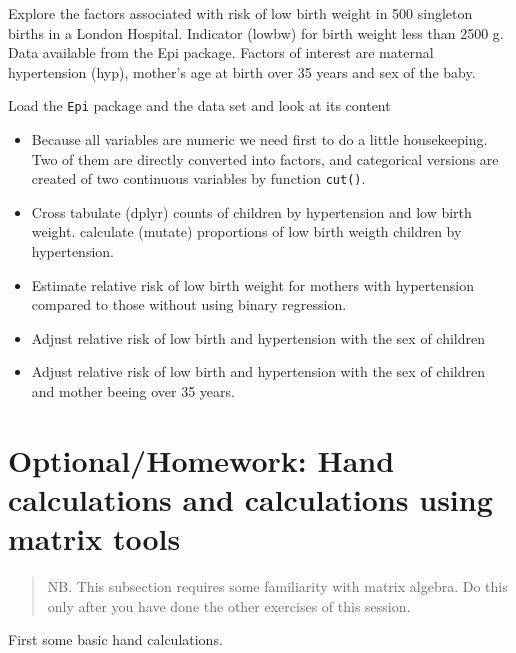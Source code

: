\documentclass[
]{book}
\begin{document}
Explore the factors associated with risk of low birth weight
in 500 singleton births in a London Hospital. Indicator (lowbw) for birth weight less than 2500 g. Data available from the Epi package. Factors of interest are
maternal hypertension (hyp), mother's age at birth over 35 years and sex of the baby.

Load the \texttt{Epi} package and the data set and look at its content

\begin{itemize}
\item
  Because all variables are numeric we need first to do a little housekeeping.
  Two of them are directly converted into factors,
  and categorical versions are created of two continuous variables by function \texttt{cut()}.
\item
  Cross tabulate (dplyr) counts of children by hypertension and low birth weight.
  calculate (mutate) proportions of low birth weigth children by hypertension.
\item
  Estimate relative risk of low birth weight for mothers with hypertension compared to those without using binary regression.
\item
  Adjust relative risk of low birth and hypertension with the sex of children
\item
  Adjust relative risk of low birth and hypertension with the sex of children and mother beeing over 35 years.
\end{itemize}

\section{Optional/Homework: Hand calculations and calculations using matrix tools}\label{optionalhomework-hand-calculations-and-calculations-using-matrix-tools}

\begin{quote}
NB. This subsection requires some familiarity with matrix algebra. Do this only after you have done the other exercises of this session.
\end{quote}

First some basic hand calculations.
\end{document}
